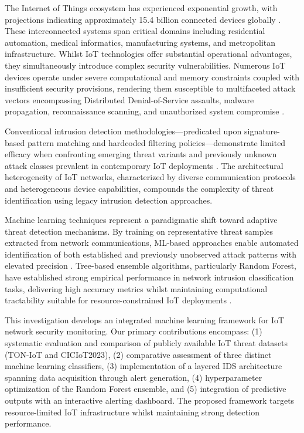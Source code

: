 \documentclass[conference]{IEEEtran}
\begin{document}
The Internet of Things ecosystem has experienced exponential growth, with projections indicating approximately 15.4 billion connected devices globally \cite{b20}. These interconnected systems span critical domains including residential automation, medical informatics, manufacturing systems, and metropolitan infrastructure. Whilst IoT technologies offer substantial operational advantages, they simultaneously introduce complex security vulnerabilities. Numerous IoT devices operate under severe computational and memory constraints coupled with insufficient security provisions, rendering them susceptible to multifaceted attack vectors encompassing Distributed Denial-of-Service assaults, malware propagation, reconnaissance scanning, and unauthorized system compromise \cite{b24}.

Conventional intrusion detection methodologies—predicated upon signature-based pattern matching and hardcoded filtering policies—demonstrate limited efficacy when confronting emerging threat variants and previously unknown attack classes prevalent in contemporary IoT deployments \cite{b16}. The architectural heterogeneity of IoT networks, characterized by diverse communication protocols and heterogeneous device capabilities, compounds the complexity of threat identification using legacy intrusion detection approaches.

Machine learning techniques represent a paradigmatic shift toward adaptive threat detection mechanisms. By training on representative threat samples extracted from network communications, ML-based approaches enable automated identification of both established and previously unobserved attack patterns with elevated precision \cite{b6}. Tree-based ensemble algorithms, particularly Random Forest, have established strong empirical performance in network intrusion classification tasks, delivering high accuracy metrics whilst maintaining computational tractability suitable for resource-constrained IoT deployments \cite{b12}.

This investigation develops an integrated machine learning framework for IoT network security monitoring. Our primary contributions encompass: (1) systematic evaluation and comparison of publicly available IoT threat datasets (TON-IoT and CICIoT2023), (2) comparative assessment of three distinct machine learning classifiers, (3) implementation of a layered IDS architecture spanning data acquisition through alert generation, (4) hyperparameter optimization of the Random Forest ensemble, and (5) integration of predictive outputs with an interactive alerting dashboard. The proposed framework targets resource-limited IoT infrastructure whilst maintaining strong detection performance.
\end{document}
